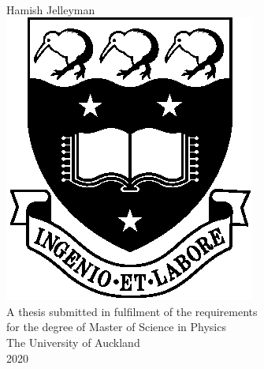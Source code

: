 \documentclass[a4paper,twoside,12pt]{book}
\begin{document}
\frontmatter
\begin{titlepage} \null\vfill \centering
  {\Huge \bf } \\ \vspace{20mm} {\Large Hamish Jelleyman} \\ \vspace{20mm} \includegraphics{Images/UoA_Crest.eps} \\ \vspace{20mm} A thesis submitted in fulfilment of the requirements \\ for the degree of Master of Science in Physics \\ \vspace{20mm} The University of Auckland \\ 2020
\vfill\null \end{titlepage}




\tableofcontents
\listoffigures
\listoftables

\mainmatter







\end{document}
